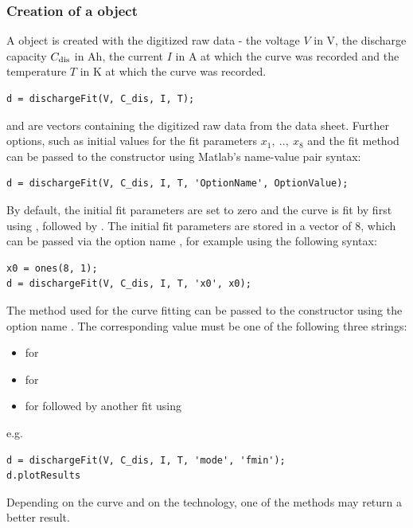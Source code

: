 \subsubsection{Creation of a  object}
\label{sec:dischargeFit_creation}
A  object is created with the digitized raw data - the voltage $V$ in V, the discharge capacity $C_\text{dis}$ in Ah, the current $I$ in A at which the curve was recorded and the temperature $T$ in K at which the curve was recorded.
\begin{lstlisting}
d = dischargeFit(V, C_dis, I, T);
\end{lstlisting}
 and  are vectors containing the digitized raw data from the data sheet. Further options, such as initial values for the fit parameters $x_1,\ ..,\ x_8$ and the fit method can be passed to the constructor using Matlab's name-value pair syntax:
\begin{lstlisting}
d = dischargeFit(V, C_dis, I, T, 'OptionName', OptionValue);
\end{lstlisting}
By default, the initial fit parameters are set to zero and the curve is fit by first using , followed by . The initial fit parameters are stored in a vector  of  8, which can be passed via the option name , for example using the following syntax:
\begin{lstlisting}
x0 = ones(8, 1);
d = dischargeFit(V, C_dis, I, T, 'x0', x0);
\end{lstlisting}
The method used for the curve fitting can be passed to the constructor using the option name . The corresponding value must be one of the following three strings:
\begin{itemize}
	\item {} for 
	\item {} for 
	\item {} for  followed by another fit using 
\end{itemize}
e.g.
\begin{lstlisting}
d = dischargeFit(V, C_dis, I, T, 'mode', 'fmin');
d.plotResults
\end{lstlisting}
Depending on the curve and on the technology, one of the methods may return a better result.

